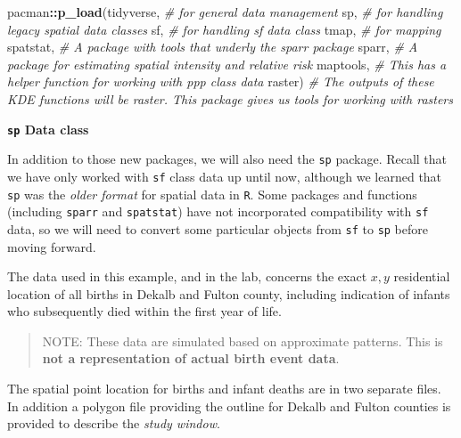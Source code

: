 \documentclass[
]{book}
\newenvironment{Shaded}{\begin{snugshade}}{\end{snugshade}}
\newcommand{\CommentTok}[1]{\textcolor[rgb]{0.56,0.35,0.01}{\textit{#1}}}
\newcommand{\FunctionTok}[1]{\textcolor[rgb]{0.13,0.29,0.53}{\textbf{#1}}}
\newcommand{\NormalTok}[1]{#1}
\newcommand{\SpecialCharTok}[1]{\textcolor[rgb]{0.81,0.36,0.00}{\textbf{#1}}}
\newenvironment{rmdnote}[1]
  {
  \begin{itemize}
  \renewcommand{\labelitemi}{
    \raisebox{-.7\height}[0pt][0pt]{
      {\setkeys{Gin}{width=3em,keepaspectratio}\texttt{[image: images/\#1]}}
    }
  }
  \setlength{\fboxsep}{1em}
  \begin{note}
  \item
  }
  {
  \end{note}
  \end{itemize}
  }
\begin{document}
\begin{Shaded}
\begin{Highlighting}[]
\NormalTok{pacman}\SpecialCharTok{::}\FunctionTok{p\_load}\NormalTok{(tidyverse,  }\CommentTok{\# for general data management}
\NormalTok{               sp,         }\CommentTok{\# for handling legacy spatial data classes}
\NormalTok{               sf,         }\CommentTok{\# for handling sf data class}
\NormalTok{               tmap,       }\CommentTok{\# for mapping}
\NormalTok{               spatstat,   }\CommentTok{\# A package with tools that underly the sparr package}
\NormalTok{               sparr,      }\CommentTok{\# A package for estimating spatial intensity and relative risk}
\NormalTok{               maptools,   }\CommentTok{\# This has a helper function for working with ppp class data}
\NormalTok{               raster)     }\CommentTok{\# The outputs of these KDE functions will be raster. This package gives us tools for working with rasters}
\end{Highlighting}
\end{Shaded}

\begin{rmdnote}{note}
\textbf{\texttt{sp} Data class}

In addition to those new packages, we will also need the \texttt{sp} package. Recall that we have only worked with \texttt{sf} class data up until now, although we learned that \texttt{sp} was the \emph{older format} for spatial data in \texttt{R}. Some packages and functions (including \texttt{sparr} and \texttt{spatstat}) have not incorporated compatibility with \texttt{sf} data, so we will need to convert some particular objects from \texttt{sf} to \texttt{sp} before moving forward.

\end{rmdnote}

The data used in this example, and in the lab, concerns the exact \(x,y\) residential location of all births in Dekalb and Fulton county, including indication of infants who subsequently died within the first year of life.

\begin{quote}
NOTE: These data are simulated based on approximate patterns. This is \textbf{not a representation of actual birth event data}.
\end{quote}

The spatial point location for births and infant deaths are in two separate files. In addition a polygon file providing the outline for Dekalb and Fulton counties is provided to describe the \emph{study window}.
\end{document}
